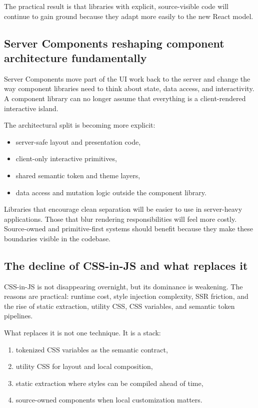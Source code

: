 The practical result is that libraries with explicit, source-visible code will continue to gain ground because they adapt more easily to the new React model.

\subsection{Server Components reshaping component architecture fundamentally}
Server Components move part of the UI work back to the server and change the way component libraries need to think about state, data access, and interactivity. A component library can no longer assume that everything is a client-rendered interactive island.

The architectural split is becoming more explicit:

\begin{itemize}[leftmargin=*, itemsep=0.35em]
  \item server-safe layout and presentation code,
  \item client-only interactive primitives,
  \item shared semantic token and theme layers,
  \item data access and mutation logic outside the component library.
\end{itemize}

Libraries that encourage clean separation will be easier to use in server-heavy applications. Those that blur rendering responsibilities will feel more costly. Source-owned and primitive-first systems should benefit because they make these boundaries visible in the codebase.

\subsection{The decline of CSS-in-JS and what replaces it}
CSS-in-JS is not disappearing overnight, but its dominance is weakening. The reasons are practical: runtime cost, style injection complexity, SSR friction, and the rise of static extraction, utility CSS, CSS variables, and semantic token pipelines.

What replaces it is not one technique. It is a stack:

\begin{enumerate}[leftmargin=*, itemsep=0.35em]
  \item tokenized CSS variables as the semantic contract,
  \item utility CSS for layout and local composition,
  \item static extraction where styles can be compiled ahead of time,
  \item source-owned components when local customization matters.
\end{enumerate}

